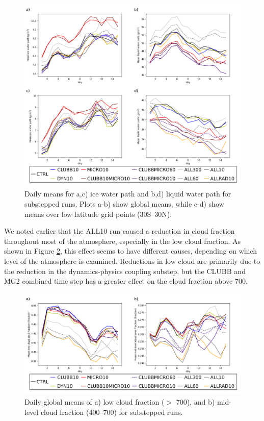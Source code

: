 \documentclass [11pt, proquest] {uwthesis}[2020/02/24]
\begin{document}
\begin{figure}
    \centering
    \includegraphics[width=6.5in]{Figure10.png}
    \caption[Cloud ice and liquid water paths over time for short EAMv1 runs using different forms of substepping]{Daily means for a,c) ice water path and b,d) liquid water path for substepped runs. Plots a-b) show global means, while c-d) show means over low latitude grid points (\num{30}S--\num{30}N).}
    \label{fig:water-path}
\end{figure}

We noted earlier that the ALL10 run caused a reduction in cloud fraction throughout most of the atmosphere, especially in the low cloud fraction. As shown in Figure \ref{fig:cldlow-cldmed}, this effect seems to have different causes, depending on which level of the atmosphere is examined. Reductions in low cloud are primarily due to the reduction in the dynamics-physics coupling substep, but the CLUBB and MG2 combined time step has a greater effect on the cloud fraction above \SI{700}{\millibar}.

\begin{figure}
    \centering
    \includegraphics[width=6.5in]{Figure11.png}
    \caption[Low and mid-level cloud fractions over time for short EAMv1 runs using different forms of substepping]{Daily global means of a) low cloud fraction ($>$ \SI{700}{\millibar}), and b) mid-level cloud fraction (\SIrange[range-phrase=--,range-units=single]{400}{700}{\millibar}) for substepped runs.}
    \label{fig:cldlow-cldmed}
\end{figure}
\end{document}
